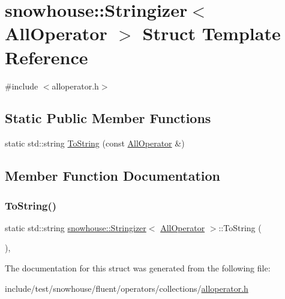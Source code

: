 \hypertarget{structsnowhouse_1_1Stringizer_3_01AllOperator_01_4}{}\section{snowhouse\+::Stringizer$<$ All\+Operator $>$ Struct Template Reference}
\label{structsnowhouse_1_1Stringizer_3_01AllOperator_01_4}


{\ttfamily \#include $<$alloperator.\+h$>$}

\subsection*{Static Public Member Functions}
\begin{DoxyCompactItemize}
\item 
static std\+::string \mbox{\hyperlink{structsnowhouse_1_1Stringizer_3_01AllOperator_01_4_a7a48a0bcb7f1d43619d6aff01a129a76}{To\+String}} (const \mbox{\hyperlink{structsnowhouse_1_1AllOperator}{All\+Operator}} \&)
\end{DoxyCompactItemize}


\subsection{Member Function Documentation}
\mbox{\label{structsnowhouse_1_1Stringizer_3_01AllOperator_01_4_a7a48a0bcb7f1d43619d6aff01a129a76}} 
\subsubsection{\texorpdfstring{ToString()}{ToString()}}
{\footnotesize\ttfamily static std\+::string \mbox{\hyperlink{structsnowhouse_1_1Stringizer}{snowhouse\+::\+Stringizer}}$<$ \mbox{\hyperlink{structsnowhouse_1_1AllOperator}{All\+Operator}} $>$\+::To\+String (\begin{DoxyParamCaption}\item[{const \mbox{\hyperlink{structsnowhouse_1_1AllOperator}{All\+Operator}} \&}]{ }\end{DoxyParamCaption})\hspace{0.3cm}{\ttfamily [inline]}, {\ttfamily [static]}}



The documentation for this struct was generated from the following file\+:\begin{DoxyCompactItemize}
\item 
include/test/snowhouse/fluent/operators/collections/\mbox{\hyperlink{alloperator_8h}{alloperator.\+h}}\end{DoxyCompactItemize}
